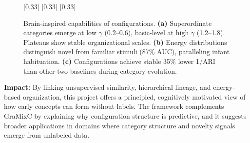\begin{figure}[ht]
  \centering
  [0.33\linewidth]{}
  [0.33\linewidth]{}
  \hspace{-1em}
  [0.33\linewidth]{}
  \caption{
    Brain-inspired capabilities of configurations.
    \textbf{(a)} Superordinate categories emerge at low $\gamma$ (0.2--0.6), basic-level at high $\gamma$ (1.2--1.8). Plateaus show stable organizational scales.
    \textbf{(b)} Energy distributions distinguish novel from familiar stimuli (87\% AUC), paralleling infant habituation.
    \textbf{(c)} Configurations achieve stable 35\% lower 1/ARI than other two baselines during category evolution.
  }
  \label{fig:04}
\end{figure}

\textbf{Impact:}
By linking unsupervised similarity, hierarchical lineage, and energy-based organization, this project offers a principled, cognitively motivated view of how early concepts can form without labels. The framework complements GraMixC by explaining why configuration structure is predictive, and it suggests broader applications in domains where category structure and novelty signals emerge from unlabeled data.
